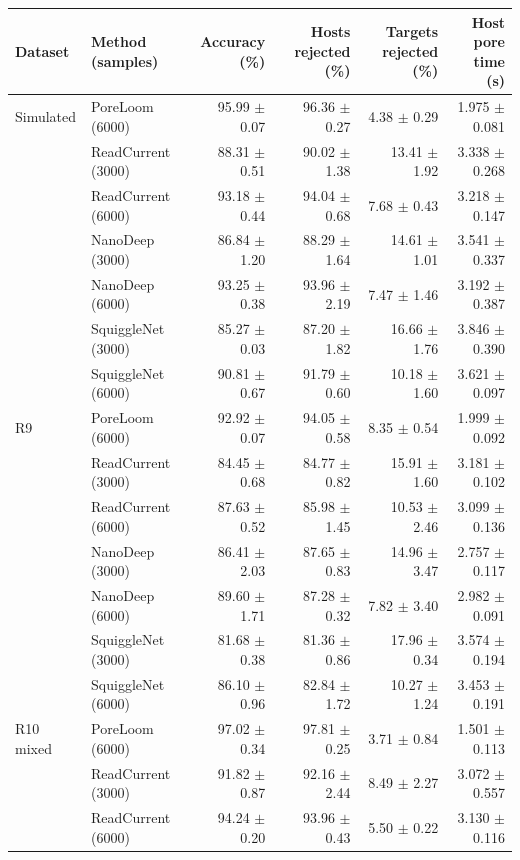 \begin{tabular}{@{}llrrrr@{}}\toprule
Dataset & Method (samples) & Accuracy (\%) & Hosts rejected (\%) & Targets rejected (\%) & Host pore time (s)\\\midrule
Simulated & PoreLoom (6000) & 95.99 $\pm$ 0.07 & 96.36 $\pm$ 0.27 & 4.38 $\pm$ 0.29 & 1.975 $\pm$ 0.081\\
 & ReadCurrent (3000) & 88.31 $\pm$ 0.51 & 90.02 $\pm$ 1.38 & 13.41 $\pm$ 1.92 & 3.338 $\pm$ 0.268\\
 & ReadCurrent (6000) & 93.18 $\pm$ 0.44 & 94.04 $\pm$ 0.68 & 7.68 $\pm$ 0.43 & 3.218 $\pm$ 0.147\\
 & NanoDeep (3000) & 86.84 $\pm$ 1.20 & 88.29 $\pm$ 1.64 & 14.61 $\pm$ 1.01 & 3.541 $\pm$ 0.337\\
 & NanoDeep (6000) & 93.25 $\pm$ 0.38 & 93.96 $\pm$ 2.19 & 7.47 $\pm$ 1.46 & 3.192 $\pm$ 0.387\\
 & SquiggleNet (3000) & 85.27 $\pm$ 0.03 & 87.20 $\pm$ 1.82 & 16.66 $\pm$ 1.76 & 3.846 $\pm$ 0.390\\
 & SquiggleNet (6000) & 90.81 $\pm$ 0.67 & 91.79 $\pm$ 0.60 & 10.18 $\pm$ 1.60 & 3.621 $\pm$ 0.097\\
\addlinespace
R9 & PoreLoom (6000) & 92.92 $\pm$ 0.07 & 94.05 $\pm$ 0.58 & 8.35 $\pm$ 0.54 & 1.999 $\pm$ 0.092\\
 & ReadCurrent (3000) & 84.45 $\pm$ 0.68 & 84.77 $\pm$ 0.82 & 15.91 $\pm$ 1.60 & 3.181 $\pm$ 0.102\\
 & ReadCurrent (6000) & 87.63 $\pm$ 0.52 & 85.98 $\pm$ 1.45 & 10.53 $\pm$ 2.46 & 3.099 $\pm$ 0.136\\
 & NanoDeep (3000) & 86.41 $\pm$ 2.03 & 87.65 $\pm$ 0.83 & 14.96 $\pm$ 3.47 & 2.757 $\pm$ 0.117\\
 & NanoDeep (6000) & 89.60 $\pm$ 1.71 & 87.28 $\pm$ 0.32 & 7.82 $\pm$ 3.40 & 2.982 $\pm$ 0.091\\
 & SquiggleNet (3000) & 81.68 $\pm$ 0.38 & 81.36 $\pm$ 0.86 & 17.96 $\pm$ 0.34 & 3.574 $\pm$ 0.194\\
 & SquiggleNet (6000) & 86.10 $\pm$ 0.96 & 82.84 $\pm$ 1.72 & 10.27 $\pm$ 1.24 & 3.453 $\pm$ 0.191\\
\addlinespace
R10 mixed & PoreLoom (6000) & 97.02 $\pm$ 0.34 & 97.81 $\pm$ 0.25 & 3.71 $\pm$ 0.84 & 1.501 $\pm$ 0.113\\
 & ReadCurrent (3000) & 91.82 $\pm$ 0.87 & 92.16 $\pm$ 2.44 & 8.49 $\pm$ 2.27 & 3.072 $\pm$ 0.557\\
 & ReadCurrent (6000) & 94.24 $\pm$ 0.20 & 93.96 $\pm$ 0.43 & 5.50 $\pm$ 0.22 & 3.130 $\pm$ 0.116\\

\end{tabular}
